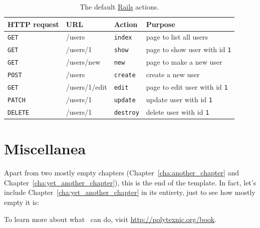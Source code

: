 \begin{table}
\begin{tabular}{llll}
\textbf{HTTP request} & \textbf{URL} & \textbf{Action} & \textbf{Purpose} \\ \hline

\texttt{GET} & /users & \texttt{index} & page to list all users \\
\texttt{GET} & /users/1 & \texttt{show} & page to show user with id \texttt{1}\\
\texttt{GET} & /users/new & \texttt{new} & page to make a new user \\
\texttt{POST} & /users & \texttt{create} & create a new user \\
\texttt{GET} & /users/1/edit & \texttt{edit} & page to edit user with id \texttt{1} \\
\texttt{PATCH} & /users/1 & \texttt{update} & update user with id \texttt{1}  \\
\texttt{DELETE} & /users/1 & \texttt{destroy} & delete user with id \texttt{1}
\end{tabular}
\caption{The default \href{http://rubyonrails.org/}{Rails} actions.\label{table:rails_actions}}
\end{table}

\section{Miscellanea}

Apart from two mostly empty chapters (Chapter~\ref{cha:another_chapter} and Chapter~\ref{cha:yet_another_chapter}), this is the end of the template. In fact, let's include Chapter~\ref{cha:yet_another_chapter} in its entirety, just to see how mostly empty it is:


To learn more about what \PolyTeXnic\ can do, visit \href{http://polytexnic.org/book}{http://polytexnic.org/book}.